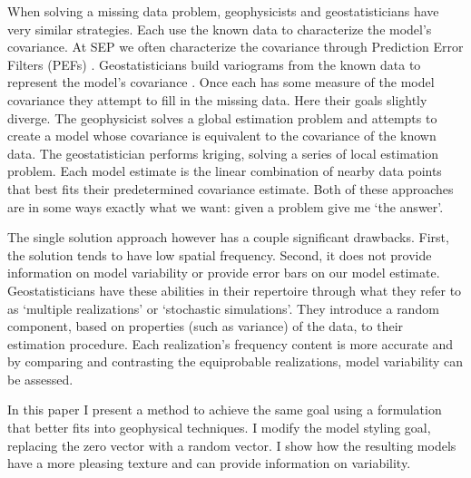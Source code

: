 \par
When solving a missing data problem, geophysicists and geostatisticians have
very similar strategies.
Each use the known data to characterize the model's covariance.  At SEP we
often characterize the covariance through Prediction Error Filters (PEFs)
\cite[]{gee}.  Geostatisticians build variograms  from the known data
to represent the model's covariance \cite[]{geostat}.  
Once each has some measure of the model covariance they attempt to fill
in the missing data. Here their goals slightly diverge.
The geophysicist solves a global estimation problem and
attempts to create a model whose 
covariance is equivalent to the covariance of the known data.
The geostatistician performs kriging, solving a series of
local estimation problem. Each model estimate
is the linear combination of nearby data points
that best fits their predetermined covariance estimate.
Both of these approaches are in some ways exactly what we want:
given a problem give me  `the answer'.  
\par
The single solution approach
however has a couple significant drawbacks.  First, the solution tends to 
have low spatial frequency. Second, it does not provide information
on model variability or provide error bars on our model estimate.
Geostatisticians  have these
abilities  in their repertoire through
what they refer to as `multiple realizations' or `stochastic simulations'.
They introduce a random component, based on
properties (such as variance) of the data,   to their estimation procedure.  
Each realization's frequency content is more accurate and by
comparing and contrasting  the equiprobable realizations,
model variability can be assessed.
\par
In this paper I present a method to achieve the same goal
using a formulation that better fits into geophysical techniques.  
I modify the model styling goal,
replacing the zero vector with a random vector.  I show  how
the resulting models have a more pleasing texture and can
provide information on variability.
